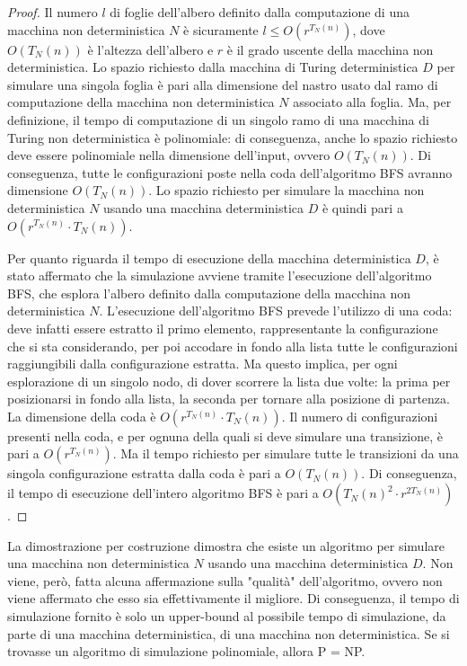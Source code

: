 \begin{proof}
    Il numero $l$ di foglie dell'albero definito dalla computazione di una macchina non deterministica $N$ è sicuramente $l \le O(r^{T_N(n)})$, dove $O(T_N(n))$ è l'altezza dell'albero e $r$ è il grado uscente della macchina non deterministica. 
    Lo spazio richiesto dalla macchina di Turing deterministica $D$ per simulare una singola foglia è pari alla dimensione del nastro usato dal ramo di computazione della macchina non deterministica $N$ associato alla foglia.
    Ma, per definizione, il tempo di computazione di un singolo ramo di una macchina di Turing non deterministica è polinomiale: di conseguenza, anche lo spazio richiesto deve essere polinomiale nella dimensione dell'input, ovvero $O(T_N(n))$. Di conseguenza, tutte le configurazioni poste nella coda dell'algoritmo BFS avranno dimensione $O(T_N(n))$.
    Lo spazio richiesto per simulare la macchina non deterministica $N$ usando una macchina deterministica $D$ è quindi pari a $O(r^{T_N(n)} \cdot T_N(n))$.
    
    Per quanto riguarda il tempo di esecuzione della macchina deterministica $D$, è stato affermato che la simulazione avviene tramite l'esecuzione dell'algoritmo BFS, che esplora l'albero definito dalla computazione della macchina non deterministica $N$.
    L'esecuzione dell'algoritmo BFS prevede l'utilizzo di una coda: deve infatti essere estratto il primo elemento, rappresentante la configurazione che si sta considerando, per poi accodare in fondo alla lista tutte le configurazioni raggiungibili dalla configurazione estratta. Ma questo implica, per ogni esplorazione di un singolo nodo, di dover scorrere la lista due volte: la prima per posizionarsi in fondo alla lista, la seconda per tornare alla posizione di partenza.
    La dimensione della coda è $O(r^{T_N(n)} \cdot T_N(n))$.
    Il numero di configurazioni presenti nella coda, e per ognuna della quali si deve simulare una transizione, è pari a $O(r^{T_N(n)})$. Ma il tempo richiesto per simulare tutte le transizioni da una singola configurazione estratta dalla coda è pari a $O(T_N(n))$.
    Di conseguenza, il tempo di esecuzione dell'intero algoritmo BFS è pari a $O({T_N(n)}^2 \cdot r^{2T_N(n)})$.
\end{proof}
\begin{rem}
    La dimostrazione per costruzione dimostra che esiste un algoritmo per simulare una macchina non deterministica $N$ usando una macchina deterministica $D$. Non viene, però, fatta alcuna affermazione sulla "qualità" dell'algoritmo, ovvero non viene affermato che esso sia effettivamente il migliore. Di conseguenza, il tempo di simulazione fornito è solo un upper-bound al possibile tempo di simulazione, da parte di una macchina deterministica, di una macchina non deterministica.
    Se si trovasse un algoritmo di simulazione polinomiale, allora P = NP.
\end{rem}

